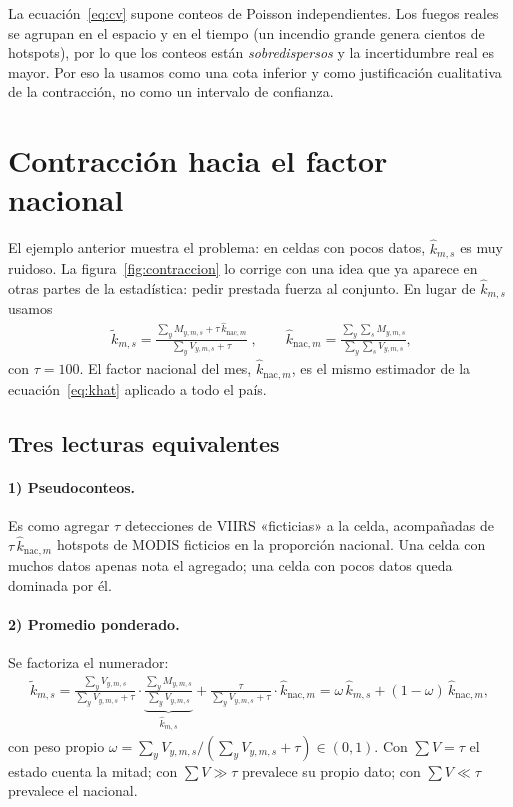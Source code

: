 \begin{cuidado}
La ecuación~\eqref{eq:cv} supone conteos de Poisson independientes. Los fuegos reales se agrupan en el espacio y en el tiempo (un incendio grande genera cientos de hotspots), por lo que los conteos están \emph{sobredispersos} y la incertidumbre real es mayor. Por eso la usamos como una cota inferior y como justificación cualitativa de la contracción, no como un intervalo de confianza.
\end{cuidado}

\section{Contracción hacia el factor nacional}\label{sec:contraccion}

El ejemplo anterior muestra el problema: en celdas con pocos datos, $\widehat k_{m,s}$ es muy ruidoso. La figura~\ref{fig:contraccion} lo corrige con una idea que ya aparece en otras partes de la estadística: pedir prestada fuerza al conjunto. En lugar de $\widehat k_{m,s}$ usamos
\begin{align}
  \boxed{\;\widetilde k_{m,s}=\frac{\sum_{y}M_{y,m,s}+\tau\,\widehat k_{\mathrm{nac},m}}{\sum_{y}V_{y,m,s}+\tau}\;},\qquad
  \widehat k_{\mathrm{nac},m}=\frac{\sum_{y}\sum_{s}M_{y,m,s}}{\sum_{y}\sum_{s}V_{y,m,s}},\label{eq:ktilde}
\end{align}
con $\tau=100$. El factor nacional del mes, $\widehat k_{\mathrm{nac},m}$, es el mismo estimador de la ecuación~\eqref{eq:khat} aplicado a todo el país.

\subsection{Tres lecturas equivalentes}

\paragraph{1) Pseudoconteos.} Es como agregar $\tau$ detecciones de VIIRS «ficticias» a la celda, acompañadas de $\tau\,\widehat k_{\mathrm{nac},m}$ hotspots de MODIS ficticios en la proporción nacional. Una celda con muchos datos apenas nota el agregado; una celda con pocos datos queda dominada por él.

\paragraph{2) Promedio ponderado.} Se factoriza el numerador:
\begin{align*}
  \widetilde k_{m,s}
  =\frac{\sum_y V_{y,m,s}}{\sum_y V_{y,m,s}+\tau}\cdot\underbrace{\frac{\sum_y M_{y,m,s}}{\sum_y V_{y,m,s}}}_{\widehat k_{m,s}}
  +\frac{\tau}{\sum_y V_{y,m,s}+\tau}\cdot\widehat k_{\mathrm{nac},m}
  =\omega\,\widehat k_{m,s}+(1-\omega)\,\widehat k_{\mathrm{nac},m},
\end{align*}
con peso propio $\omega=\sum_yV_{y,m,s}/(\sum_yV_{y,m,s}+\tau)\in(0,1)$. Con $\sum V=\tau$ el estado cuenta la mitad; con $\sum V\gg\tau$ prevalece su propio dato; con $\sum V\ll\tau$ prevalece el nacional.

